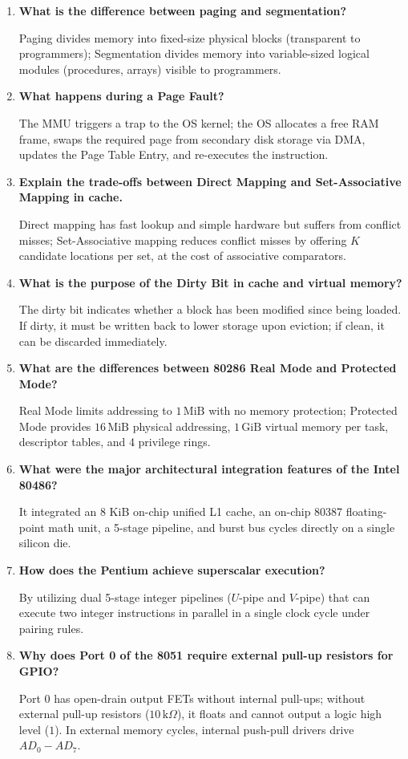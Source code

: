 \documentclass[12pt,a4paper]{article}
\newcommand{\Q}[1]{\textbf{#1}\par\noindent\ignorespaces}
\begin{document}
\begin{tcolorbox}[exambox, title={Frequently Asked / Viva Questions}]
\begin{enumerate}[leftmargin=*, label=\textbf{Q\arabic*.}, itemsep=2.5pt]
  \item \Q{What is the difference between paging and segmentation?}
  Paging divides memory into fixed-size physical blocks (transparent to programmers); Segmentation divides memory into variable-sized logical modules (procedures, arrays) visible to programmers.
  \item \Q{What happens during a Page Fault?}
  The MMU triggers a trap to the OS kernel; the OS allocates a free RAM frame, swaps the required page from secondary disk storage via DMA, updates the Page Table Entry, and re-executes the instruction.
  \item \Q{Explain the trade-offs between Direct Mapping and Set-Associative Mapping in cache.}
  Direct mapping has fast lookup and simple hardware but suffers from conflict misses; Set-Associative mapping reduces conflict misses by offering $K$ candidate locations per set, at the cost of associative comparators.
  \item \Q{What is the purpose of the Dirty Bit in cache and virtual memory?}
  The dirty bit indicates whether a block has been modified since being loaded. If dirty, it must be written back to lower storage upon eviction; if clean, it can be discarded immediately.
  \item \Q{What are the differences between 80286 Real Mode and Protected Mode?}
  Real Mode limits addressing to $1\,\mathrm{MiB}$ with no memory protection; Protected Mode provides $16\,\mathrm{MiB}$ physical addressing, $1\,\mathrm{GiB}$ virtual memory per task, descriptor tables, and 4 privilege rings.
  \item \Q{What were the major architectural integration features of the Intel 80486?}
  It integrated an 8 KiB on-chip unified L1 cache, an on-chip 80387 floating-point math unit, a 5-stage pipeline, and burst bus cycles directly on a single silicon die.
  \item \Q{How does the Pentium achieve superscalar execution?}
  By utilizing dual 5-stage integer pipelines ($U$-pipe and $V$-pipe) that can execute two integer instructions in parallel in a single clock cycle under pairing rules.
  \item \Q{Why does Port 0 of the 8051 require external pull-up resistors for GPIO?}
  Port 0 has open-drain output FETs without internal pull-ups; without external pull-up resistors ($10\,\mathrm{k}\Omega$), it floats and cannot output a logic high level ($1$). In external memory cycles, internal push-pull drivers drive $AD_0-AD_7$.

\end{enumerate}
\end{tcolorbox}
\end{document}
